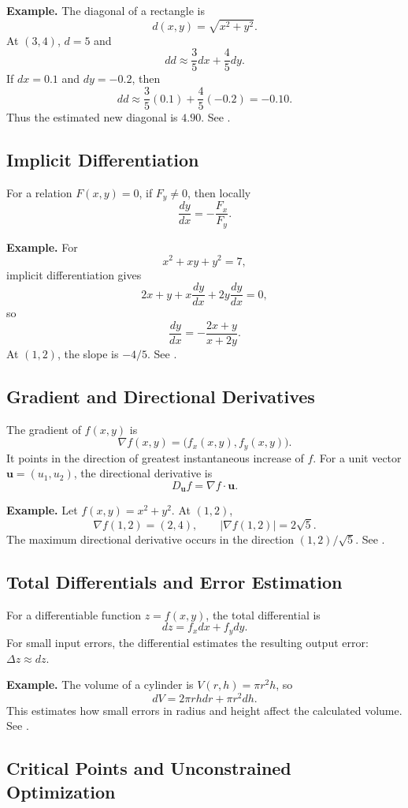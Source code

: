 \documentclass[a4paper,12pt]{article}
\theoremstyle{mystyle}
\numberwithin{equation}{section}
\numberwithin{theorem}{section}
\numberwithin{proposition}{section}
\numberwithin{example}{section}
\numberwithin{remark}{section}
\numberwithin{lemma}{section}
\numberwithin{corollary}{section}
\numberwithin{definition}{section}
\begin{document}
\textbf{Example.} The diagonal of a rectangle is
\[
d(x,y)=\sqrt{x^2+y^2}.
\]
At $(3,4)$, $d=5$ and
\[
dd\approx \frac{3}{5}dx+\frac{4}{5}dy.
\]
If $dx=0.1$ and $dy=-0.2$, then
\[
dd\approx \frac35(0.1)+\frac45(-0.2)=-0.10.
\]
Thus the estimated new diagonal is $4.90$. See \cite[Section 4.4]{strangherman2016}.

\subsection{Implicit Differentiation}

For a relation $F(x,y)=0$, if $F_y\ne0$, then locally
\[
\frac{dy}{dx}=-\frac{F_x}{F_y}.
\]

\textbf{Example.} For
\[
x^2+xy+y^2=7,
\]
implicit differentiation gives
\[
2x+y+x\frac{dy}{dx}+2y\frac{dy}{dx}=0,
\]
so
\[
\frac{dy}{dx}=-\frac{2x+y}{x+2y}.
\]
At $(1,2)$, the slope is $-4/5$. See \cite[Section 4.5]{strangherman2016}.

\subsection{Gradient and Directional Derivatives}

The gradient of $f(x,y)$ is
\[
\nabla f(x,y)=\bigl(f_x(x,y),f_y(x,y)\bigr).
\]
It points in the direction of greatest instantaneous increase of $f$. For a unit vector $\mathbf u=(u_1,u_2)$, the directional derivative is
\[
D_{\mathbf u}f=\nabla f\cdot\mathbf u.
\]

\textbf{Example.} Let $f(x,y)=x^2+y^2$. At $(1,2)$,
\[
\nabla f(1,2)=(2,4),
\qquad
|\nabla f(1,2)|=2\sqrt5.
\]
The maximum directional derivative occurs in the direction $(1,2)/\sqrt5$. See \cite[Section 4.6]{strangherman2016}.

\subsection{Total Differentials and Error Estimation}

For a differentiable function $z=f(x,y)$, the total differential is
\[
dz=f_xdx+f_ydy.
\]
For small input errors, the differential estimates the resulting output error: $\Delta z\approx dz$.

\textbf{Example.} The volume of a cylinder is $V(r,h)=\pi r^2h$, so
\[
dV=2\pi rhdr+\pi r^2dh.
\]
This estimates how small errors in radius and height affect the calculated volume. See \cite[Section 4.4]{strangherman2016}.

\subsection{Critical Points and Unconstrained Optimization}
\end{document}

